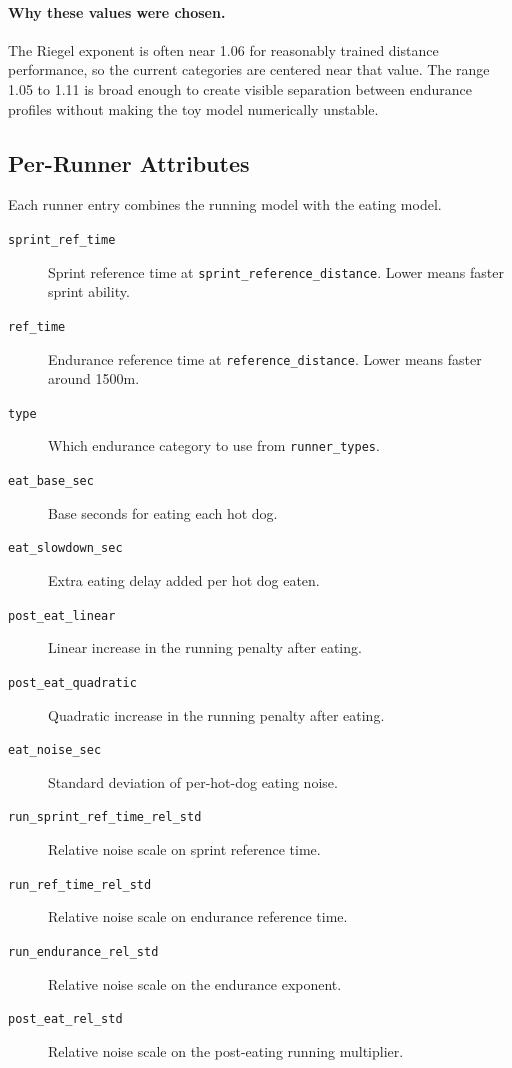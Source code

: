 \documentclass[11pt]{article}
\begin{document}
\paragraph{Why these values were chosen.}
The Riegel exponent is often near 1.06 for reasonably trained distance performance, so the current categories are centered near that value. The range 1.05 to 1.11 is broad enough to create visible separation between endurance profiles without making the toy model numerically unstable.

\subsection*{Per-Runner Attributes}

Each runner entry combines the running model with the eating model.

\begin{description}
    \item[\texttt{sprint\_ref\_time}] Sprint reference time at \texttt{sprint\_reference\_distance}. Lower means faster sprint ability.
    \item[\texttt{ref\_time}] Endurance reference time at \texttt{reference\_distance}. Lower means faster around 1500m.
    \item[\texttt{type}] Which endurance category to use from \texttt{runner\_types}.
    \item[\texttt{eat\_base\_sec}] Base seconds for eating each hot dog.
    \item[\texttt{eat\_slowdown\_sec}] Extra eating delay added per hot dog eaten.
    \item[\texttt{post\_eat\_linear}] Linear increase in the running penalty after eating.
    \item[\texttt{post\_eat\_quadratic}] Quadratic increase in the running penalty after eating.
    \item[\texttt{eat\_noise\_sec}] Standard deviation of per-hot-dog eating noise.
    \item[\texttt{run\_sprint\_ref\_time\_rel\_std}] Relative noise scale on sprint reference time.
    \item[\texttt{run\_ref\_time\_rel\_std}] Relative noise scale on endurance reference time.
    \item[\texttt{run\_endurance\_rel\_std}] Relative noise scale on the endurance exponent.
    \item[\texttt{post\_eat\_rel\_std}] Relative noise scale on the post-eating running multiplier.
\end{description}
\end{document}
